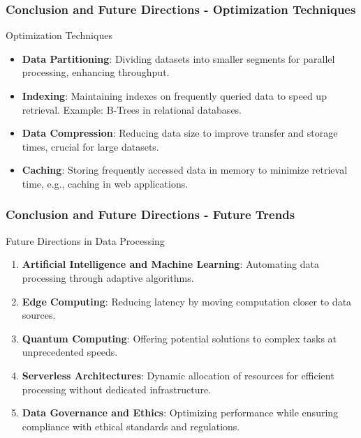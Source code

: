 \documentclass[aspectratio=169]{beamer}
\begin{document}
\begin{frame}[fragile]
    \frametitle{Conclusion and Future Directions - Optimization Techniques}
    \begin{block}{Optimization Techniques}
        \begin{itemize}
            \item \textbf{Data Partitioning}: Dividing datasets into smaller segments for parallel processing, enhancing throughput.
            \item \textbf{Indexing}: Maintaining indexes on frequently queried data to speed up retrieval. Example: B-Trees in relational databases.
            \item \textbf{Data Compression}: Reducing data size to improve transfer and storage times, crucial for large datasets.
            \item \textbf{Caching}: Storing frequently accessed data in memory to minimize retrieval time, e.g., caching in web applications.
        \end{itemize}
    \end{block}
\end{frame}

\begin{frame}[fragile]
    \frametitle{Conclusion and Future Directions - Future Trends}
    \begin{block}{Future Directions in Data Processing}
        \begin{enumerate}
            \item \textbf{Artificial Intelligence and Machine Learning}: Automating data processing through adaptive algorithms.
            \item \textbf{Edge Computing}: Reducing latency by moving computation closer to data sources.
            \item \textbf{Quantum Computing}: Offering potential solutions to complex tasks at unprecedented speeds.
            \item \textbf{Serverless Architectures}: Dynamic allocation of resources for efficient processing without dedicated infrastructure.
            \item \textbf{Data Governance and Ethics}: Optimizing performance while ensuring compliance with ethical standards and regulations.
        \end{enumerate}
    \end{block}
\end{frame}
\end{document}
